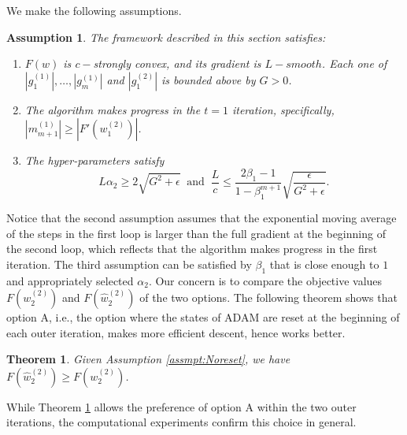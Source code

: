 \documentclass[twoside]{article}
\newtheorem{assumption}{Assumption}
\newtheorem{theorem}{Theorem}
\begin{document}
 We make the following assumptions.
\begin{assumption} The framework described in this section satisfies:
\begin{enumerate}
\label{assmpt:Noreset}
    \item $F(w)$ is $c-$strongly convex, and its gradient is $L-smooth$. Each one of $\left|g_1^{(1)}\right|,\ldots,\left|g_m^{(1)}\right|$ and $\left|g_1^{(2)}\right|$ is bounded above by $G>0$.
    \item The algorithm makes progress in the $t=1$ iteration, specifically, $\left|m^{(1)}_{m+1}\right| \geq \left|F'\left(w^{(2)}_{1}\right)\right|$.
    \item The hyper-parameters satisfy 
    \begin{equation*}
       L\alpha_2\geq 2\sqrt{G^2 + \epsilon} \;\;\text{and} \;\; \frac{L}{c} \leq \frac{2\beta_1-1}{1-\beta_1^{m+1}}\sqrt{\frac{\epsilon}{G^2 + \epsilon}}.
    \end{equation*}
\end{enumerate}
\end{assumption}
Notice that the second assumption assumes that the exponential moving average of the steps in the first loop is larger than the full gradient at the beginning of the second loop, which reflects that the algorithm makes progress in the first iteration. The third assumption can be satisfied by $\beta_1$ that is close enough to $1$ and appropriately selected $\alpha_2$. Our concern is to compare the objective values $F\left(w^{(2)}_2 \right)$ and $F\left( \hat w^{(2)}_2\right)$ of the two options. The following theorem shows that option A, i.e., the option where the states of ADAM are reset at the beginning of each outer iteration, makes more efficient descent, hence works better.
\begin{theorem}
\label{thm:ResetBetter}
Given Assumption \ref{assmpt:Noreset}, we have $F\left(\hat w^{(2)}_2\right) \geq F\left(w^{(2)}_2 \right)$.
\end{theorem}
While Theorem \ref{thm:ResetBetter} allows the preference of option A within the two outer iterations, the computational experiments confirm this choice in general.
\end{document}
